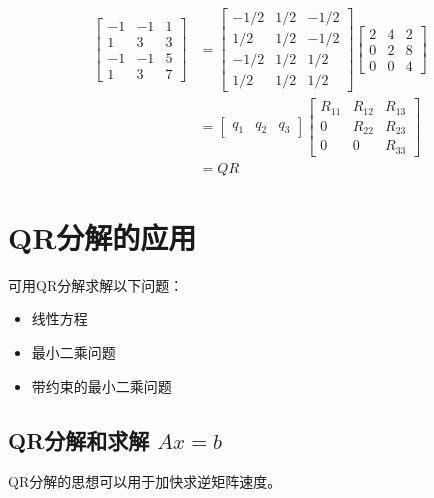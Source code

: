 \begin{example}
    $$
\begin{aligned}
\left[\begin{array}{rrr}
-1 & -1 & 1 \\
1 & 3 & 3 \\
-1 & -1 & 5 \\
1 & 3 & 7
\end{array}\right] &=\left[\begin{array}{rrr}
-1 / 2 & 1 / 2 & -1 / 2 \\
1 / 2 & 1 / 2 & -1 / 2 \\
-1 / 2 & 1 / 2 & 1 / 2 \\
1 / 2 & 1 / 2 & 1 / 2
\end{array}\right]\left[\begin{array}{rrr}
2 & 4 & 2 \\
0 & 2 & 8 \\
0 & 0 & 4
\end{array}\right] \\
&=\left[\begin{array}{lll}
q_{1} & q_{2} & q_{3}
\end{array}\right]\left[\begin{array}{ccc}
R_{11} & R_{12} & R_{13} \\
0 & R_{22} & R_{23} \\
0 & 0 & R_{33}
\end{array}\right] \\
&=Q R
\end{aligned}
$$
\end{example}

\section{QR分解的应用}

可用QR分解求解以下问题：

\begin{itemize}
    \item 线性方程
    \item 最小二乘问题
    \item 带约束的最小二乘问题
\end{itemize}

\subsection{QR分解和求解 $Ax = b$ }

QR分解的思想可以用于加快求逆矩阵速度。

